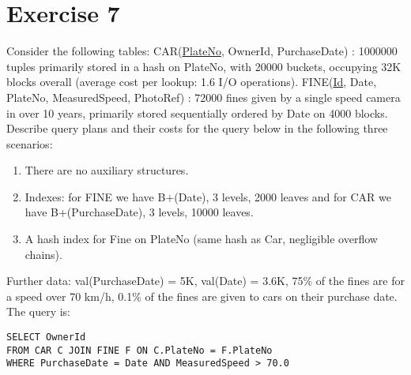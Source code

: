 \section{Exercise 7}

Consider the following tables: 
CAR(\underline{PlateNo}, OwnerId, PurchaseDate) : 1000000 tuples primarily stored in a hash on PlateNo, with 20000 buckets, occupying 32K blocks overall (average cost per lookup: 1.6 I/O operations).
FINE(\underline{Id}, Date, PlateNo, MeasuredSpeed, PhotoRef) : 72000 fines given by a single speed camera in over 10 years, primarily stored sequentially ordered by Date on 4000 blocks.
Describe query plans and their costs for the query below in the following three scenarios: 
\begin{enumerate}
    \item There are no auxiliary structures. 
    \item Indexes: for FINE we have B+(Date), 3 levels, 2000 leaves and for CAR we have B+(PurchaseDate), 3 levels, 10000 leaves. 
    \item A hash index for Fine on PlateNo (same hash as Car, negligible overflow chains).
\end{enumerate}
Further data: val(PurchaseDate) = 5K, val(Date) = 3.6K, 75\% of the fines are for a speed over 70 km/h, 0.1\% of the fines are given to cars on their purchase date.
The query is: 
\begin{lstlisting}[style=SQL]
SELECT OwnerId 
FROM CAR C JOIN FINE F ON C.PlateNo = F.PlateNo
WHERE PurchaseDate = Date AND MeasuredSpeed > 70.0
\end{lstlisting}


